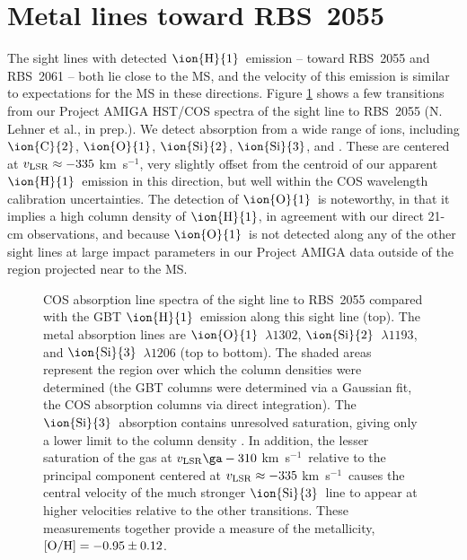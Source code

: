 \documentclass[12pt,preprint]{aastex6}
\newcommand{\MSmetallicity}{\ensuremath{-0.95\pm0.12}}
\newcommand{\HI}{\ensuremath{\mbox{\ion{H}{1}}}}
\newcommand{\OI}{\ensuremath{\mbox{\ion{O}{1}}}}
\newcommand{\SiII}{\ensuremath{\mbox{\ion{Si}{2}}}}
\newcommand{\SiIII}{\ensuremath{\mbox{\ion{Si}{3}}}}
\newcommand{\CII}{\ensuremath{\mbox{\ion{C}{2}}}}
\newcommand{\kms}{km~s$^{-1}$}
\newcommand{\vlsr}{\ensuremath{v_{\rm LSR}\relax}}
\begin{document}
\appendix
\section{Metal lines toward RBS~2055}
\label{sec:appendix}

The sight lines with detected \HI\ emission -- toward RBS~2055 and
RBS~2061 -- both lie close to the MS, and the velocity of this
emission is similar to expectations for the MS in these
directions. Figure \ref{fig:COSspectra} shows a few transitions from
our Project AMIGA HST/COS spectra of the sight line to RBS~2055
(N. Lehner et al., in prep.). We detect absorption from a wide range
of ions, including \CII, \OI, \SiII, \SiIII, and . These
are centered at $\vlsr \approx -335$ \kms, very slightly offset from
the centroid of our apparent \HI\ emission in this direction, but well
within the COS wavelength calibration uncertainties. The detection of
\OI\ is noteworthy, in that it implies a high column density of \HI,
in agreement with our direct 21-cm observations, and because \OI\ is
not detected along any of the other sight lines at large impact
parameters in our Project AMIGA data outside of the region projected
near to the MS.

\begin{figure}

\caption{COS absorption line spectra of the sight line to RBS~2055
  compared with the GBT \HI\ emission along this sight line (top). The
  metal absorption lines are \OI\ $\lambda1302$, \SiII\ $\lambda1193$,
  and \SiIII\ $\lambda1206$ (top to bottom). The shaded areas
  represent the region over which the column densities were determined
  (the GBT columns were determined via a Gaussian fit, the COS
  absorption columns via direct integration). The \SiIII\ absorption
  contains unresolved saturation, giving only a lower limit to the
  column density . In addition, the
  lesser saturation of the gas at $\vlsr \ga -310$ \kms\ relative to
  the principal component centered at $\vlsr \approx -335$ \kms\
  causes the central velocity of the much stronger \SiIII\ line to
  appear at higher velocities relative to the other transitions.
  These measurements together provide a measure of the metallicity,
  $[{\rm O/H}] = \MSmetallicity$. \label{fig:COSspectra}}
\end{figure}
\end{document}
